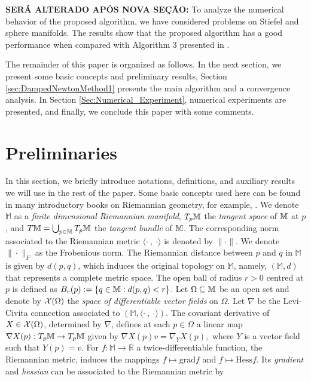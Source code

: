{\bf SERÁ ALTERADO APÓS NOVA SEÇÃO:} To analyze the numerical behavior of the proposed algorithm, we have considered problems on Stiefel and sphere manifolds.
 The results show that the proposed algorithm has a good performance when compared with Algorithm 3 presented in \cite{bortoloti2022efficient}.



The remainder of this paper is organized as follows. In the next section, we present some basic concepts and preliminary results, Section \ref{sec:DampedNewtonMethod1} presents the main algorithm and a convergence analysis. In Section \ref{Sec:Numerical_Experiment}, numerical experiments are presented, and finally, we conclude this paper with some comments.

\section{Preliminaries}\label{sec:basic}
In this section, we briefly introduce notations, definitions, and auxiliary results we will use in the rest of the paper. Some basic concepts used here can be found in many introductory books on Riemannian geometry, for example, \cite{doCarmo1992,Sakai1996}.
We denote $\mathbb{M}$ as a {\it finite dimensional Riemannian manifold},
$T_{p}\mathbb{M}$ the {\it tangent space} of $\mathbb{M}$ at $p$, and $T\mathbb{M}=\bigcup_{p\in\mathbb{M}}T_{p}\mathbb{M}$ the {\it tangent bundle} of $\mathbb{M}$.
The corresponding norm associated to the Riemannian metric $\langle \cdot ~, ~ \cdot \rangle$ is denoted by $\|  \cdot \|$. We denote $\|\cdot\|_F$ as the Frobenious norm. The Riemannian  distance  between $p$ and $q$ in $\mathbb{M}$ is given  by $d(p,q)$,  which induces the original topology on $\mathbb{M}$, namely,  $(\mathbb{M}, d)$ that represents a complete metric space.   The open ball of radius $r>0$ centred at $p$ is defined as  $B_{r}(p):=\left\lbrace q\in\mathbb{M}:d(p,q)<r\right\rbrace$.  Let  $\Omega \subseteq   \mathbb{M}$ be an open set and denote by ${\cal X}(\Omega)$ the {\it space of  differentiable  vector fields} on $\Omega$.  Let $\nabla$ be the Levi-Civita connection associated to $(\mathbb{M}, \langle \cdot ~, ~ \cdot \rangle)$.  The covariant derivative of $X \in {\cal X}(\Omega)$, determined by $\nabla$, defines at each $p\in \Omega$ a linear map $\nabla X(p):T_{p}\mathbb{M}\to T_{p}\mathbb{M}$ given by $\nabla X(p)v=\nabla_{Y}X(p),$
where $Y$ is a vector field such that $Y(p)=v$.
For $f: \mathbb{M} \to \mathbb{R}$ a twice-differentiable function, the Riemannian metric, induces the mappings $f\mapsto  \mbox{grad} f $ and   $f\mapsto \mbox{Hess} f$. Its {\it gradient} and {\it hessian} can be associated to the Riemannian metric by
